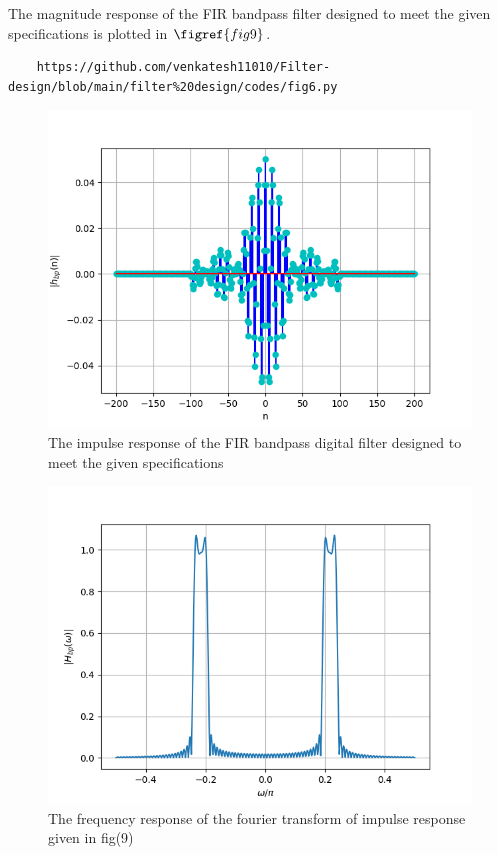 \documentclass{article}
\begin{document}
The magnitude response of the FIR bandpass filter designed to meet the given specifications is plotted in $\figref{fig9}$.
\begin{lstlisting}
	https://github.com/venkatesh11010/Filter-design/blob/main/filter%20design/codes/fig6.py
\end{lstlisting}
\begin{figure}[H]
\includegraphics[width = \columnwidth]{figs/Hbp_impulse.png}
\caption{The impulse response of the FIR bandpass digital filter designed to meet the given specifications}
\label{fig9}
\end{figure}

\begin{figure}[H]
\includegraphics[width = \columnwidth]{figs/Hbp_frequency.png}
\caption{The frequency response of the fourier transform of impulse response given in fig(9)} 
\label{fig10}
\end{figure}
\end{document}
